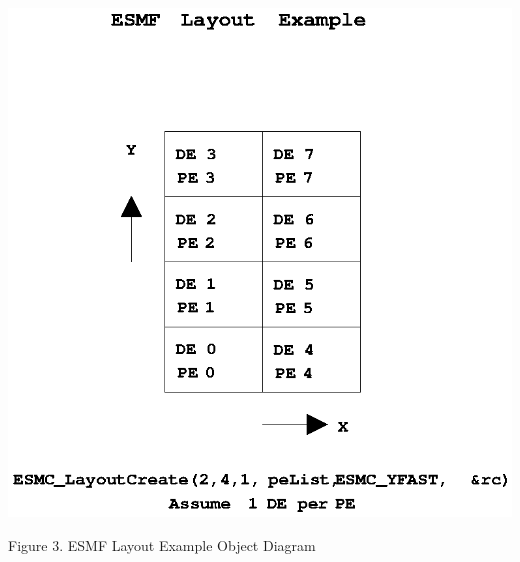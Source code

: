 \begin{center}
\includegraphics{Layout.EPS}

Figure 3.  ESMF Layout Example Object Diagram

\end{center}
